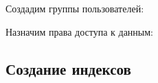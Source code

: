 \documentclass[a4paper,14pt]{article}
\begin{document}
Создадим группы пользователей:

{\small }

Назначим права доступа к данным:

{\small }

\subsection{Создание индексов}

{\small }
%	
\end{document}
